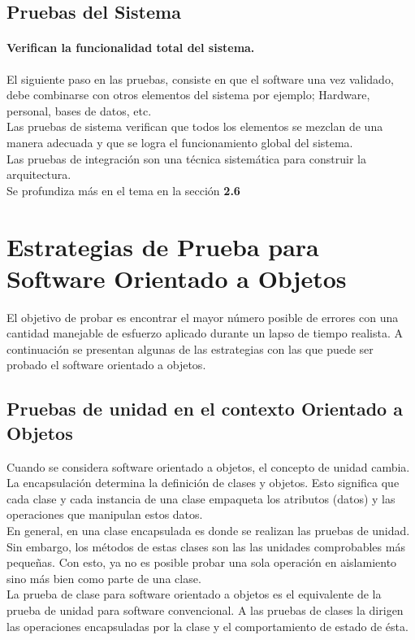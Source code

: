 \subsection{Pruebas del Sistema}
\paragraph{Verifican la funcionalidad total del sistema.}
El siguiente paso en las pruebas, consiste en que el software una vez validado, debe combinarse con otros elementos del sistema por ejemplo; Hardware, personal, bases de datos, etc.\\ Las pruebas de sistema verifican que todos los elementos se mezclan de una manera adecuada y que se logra el funcionamiento global del sistema.\\ Las pruebas de integración son una técnica sistemática para construir la arquitectura.\\ Se profundiza más en el tema en la sección \textbf{2.6}
\section{Estrategias de Prueba para Software Orientado a Objetos}
El objetivo de probar es encontrar el mayor número posible de errores con una cantidad manejable de esfuerzo aplicado durante un lapso de tiempo realista. A continuación se presentan algunas de las estrategias con las que puede ser probado el software orientado a objetos.
\subsection{Pruebas de unidad en el contexto Orientado a Objetos}
Cuando se considera software orientado a objetos, el concepto de unidad cambia. La encapsulación determina la definición de clases y objetos. Esto significa que cada clase y cada instancia de una clase empaqueta los atributos (datos) y las operaciones que manipulan estos datos.\\ En general, en una clase encapsulada es donde se realizan las pruebas de unidad. Sin embargo, los métodos de estas clases son las las unidades comprobables más pequeñas. Con esto, ya no es posible probar una sola operación en aislamiento sino más bien como parte de una clase.\\
La prueba de clase para software orientado a objetos es el equivalente de la prueba de unidad para software convencional. A las pruebas de clases la dirigen las operaciones encapsuladas por la clase y el comportamiento de estado de ésta.
